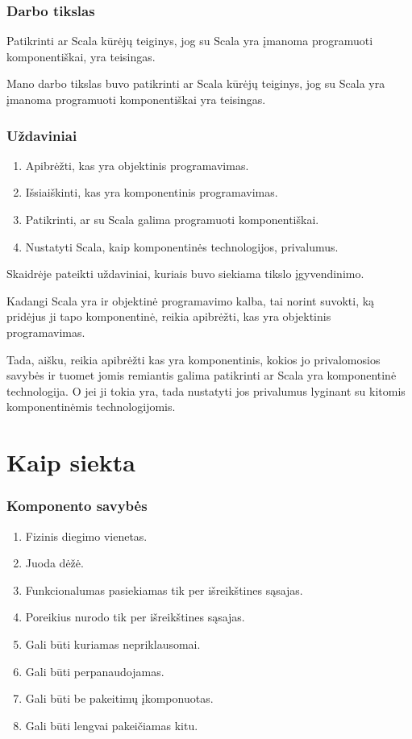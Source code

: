 \begin{frame}
  \frametitle{Darbo tikslas}
  Patikrinti ar Scala kūrėjų teiginys, jog su Scala yra įmanoma
  programuoti komponentiškai, yra teisingas.
  \begin{handout}
    Mano darbo tikslas buvo patikrinti ar Scala kūrėjų teiginys, jog
    su Scala yra įmanoma programuoti komponentiškai yra teisingas.
  \end{handout}
\end{frame}

\begin{frame}
  \frametitle{Uždaviniai}
  \begin{enumerate}
    \item Apibrėžti, kas yra objektinis programavimas.
    \item Išsiaiškinti, kas yra komponentinis programavimas.
    \item Patikrinti, ar su Scala galima programuoti komponentiškai.
    \item Nustatyti Scala, kaip komponentinės technologijos, privalumus.
  \end{enumerate}
  \begin{handout}
    Skaidrėje pateikti uždaviniai, kuriais buvo siekiama tikslo
    įgyvendinimo.

    Kadangi Scala yra ir objektinė programavimo kalba, tai
    norint suvokti, ką pridėjus ji tapo komponentinė, reikia
    apibrėžti, kas yra objektinis programavimas.

    Tada, aišku, reikia apibrėžti kas yra komponentinis, kokios jo
    privalomosios savybės ir tuomet jomis remiantis galima patikrinti
    ar Scala yra komponentinė technologija. O jei ji tokia yra,
    tada nustatyti jos privalumus lyginant su kitomis komponentinėmis
    technologijomis.
  \end{handout}
\end{frame}

\section{Kaip siekta}

\begin{frame}
  \frametitle{Komponento savybės}
  \begin{enumerate}
    \item Fizinis diegimo vienetas.
    \item Juoda dėžė.
    \item Funkcionalumas pasiekiamas tik per išreikštines sąsajas.
    \item Poreikius nurodo tik per išreikštines sąsajas.
    \item Gali būti kuriamas nepriklausomai.
    \item Gali būti perpanaudojamas.
    \item Gali būti be pakeitimų įkomponuotas.
    \item Gali būti lengvai pakeičiamas kitu.
  \end{enumerate}
\end{frame}

